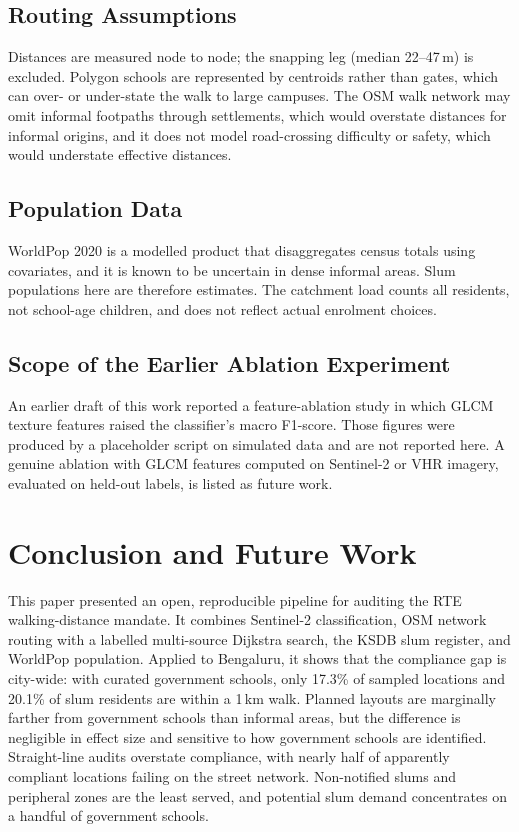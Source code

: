 \documentclass[conference]{IEEEtran}
\newcommand{\km}{\,km}
\newcommand{\m}{\,m}
\begin{document}
\subsection{Routing Assumptions}
Distances are measured node to node; the snapping leg (median 22--47\m{}) is excluded. Polygon schools are represented by centroids rather than gates, which can over- or under-state the walk to large campuses. The OSM walk network may omit informal footpaths through settlements, which would overstate distances for informal origins, and it does not model road-crossing difficulty or safety, which would understate effective distances.

\subsection{Population Data}
WorldPop 2020 is a modelled product that disaggregates census totals using covariates, and it is known to be uncertain in dense informal areas. Slum populations here are therefore estimates. The catchment load counts all residents, not school-age children, and does not reflect actual enrolment choices.

\subsection{Scope of the Earlier Ablation Experiment}
An earlier draft of this work reported a feature-ablation study in which GLCM texture features raised the classifier's macro F1-score. Those figures were produced by a placeholder script on simulated data and are not reported here. A genuine ablation with GLCM features computed on Sentinel-2 or VHR imagery, evaluated on held-out labels, is listed as future work.

\section{Conclusion and Future Work}\label{sec:conclusion}
This paper presented an open, reproducible pipeline for auditing the RTE walking-distance mandate. It combines Sentinel-2 classification, OSM network routing with a labelled multi-source Dijkstra search, the KSDB slum register, and WorldPop population. Applied to Bengaluru, it shows that the compliance gap is city-wide: with curated government schools, only 17.3\% of sampled locations and 20.1\% of slum residents are within a 1\km{} walk. Planned layouts are marginally farther from government schools than informal areas, but the difference is negligible in effect size and sensitive to how government schools are identified. Straight-line audits overstate compliance, with nearly half of apparently compliant locations failing on the street network. Non-notified slums and peripheral zones are the least served, and potential slum demand concentrates on a handful of government schools.
\end{document}

